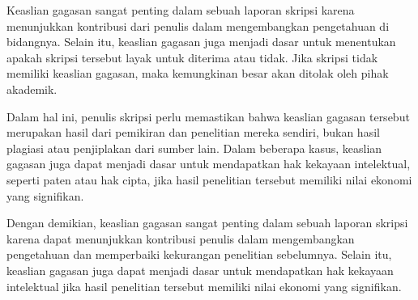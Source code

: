 Keaslian gagasan sangat penting dalam sebuah laporan skripsi karena menunjukkan kontribusi dari penulis dalam mengembangkan pengetahuan di bidangnya. Selain itu, keaslian gagasan juga menjadi dasar untuk menentukan apakah skripsi tersebut layak untuk diterima atau tidak. Jika skripsi tidak memiliki keaslian gagasan, maka kemungkinan besar akan ditolak oleh pihak akademik.

Dalam hal ini, penulis skripsi perlu memastikan bahwa keaslian gagasan tersebut merupakan hasil dari pemikiran dan penelitian mereka sendiri, bukan hasil plagiasi atau penjiplakan dari sumber lain. Dalam beberapa kasus, keaslian gagasan juga dapat menjadi dasar untuk mendapatkan hak kekayaan intelektual, seperti paten atau hak cipta, jika hasil penelitian tersebut memiliki nilai ekonomi yang signifikan.

Dengan demikian, keaslian gagasan sangat penting dalam sebuah laporan skripsi karena dapat menunjukkan kontribusi penulis dalam mengembangkan pengetahuan dan memperbaiki kekurangan penelitian sebelumnya. Selain itu, keaslian gagasan juga dapat menjadi dasar untuk mendapatkan hak kekayaan intelektual jika hasil penelitian tersebut memiliki nilai ekonomi yang signifikan.